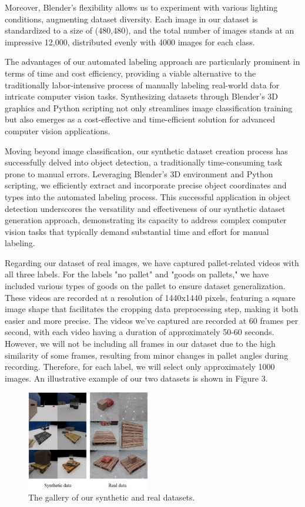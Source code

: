 \documentclass[sigconf,authordraft]{acmart}
\begin{document}
\noindent Moreover, Blender's flexibility allows us to experiment with various lighting conditions, augmenting dataset diversity. Each image in our dataset is standardized to a size of (480,480), and the total number of images stands at an impressive 12,000, distributed evenly with 4000 images for each class.

\noindent The advantages of our automated labeling approach are particularly prominent in terms of time and cost efficiency, providing a viable alternative to the traditionally labor-intensive process of manually labeling real-world data for intricate computer vision tasks. Synthesizing datasets through Blender's 3D graphics and Python scripting not only streamlines image classification training but also emerges as a cost-effective and time-efficient solution for advanced computer vision applications.

\noindent Moving beyond image classification, our synthetic dataset creation process has successfully delved into object detection, a traditionally time-consuming task prone to manual errors. Leveraging Blender's 3D environment and Python scripting, we efficiently extract and incorporate precise object coordinates and types into the automated labeling process. This successful application in object detection underscores the versatility and effectiveness of our synthetic dataset generation approach, demonstrating its capacity to address complex computer vision tasks that typically demand substantial time and effort for manual labeling.

\noindent Regarding our dataset of real images, we have captured pallet-related videos with all three labels. For the labels "no pallet" and "goods on pallets," we have included various types of goods on the pallet to ensure dataset generalization. These videos are recorded at a resolution of 1440x1440 pixels, featuring a square image shape that facilitates the cropping data preprocessing step, making it both easier and more precise. The videos we've captured are recorded at 60 frames per second, with each video having a duration of approximately 50-60 seconds. However, we will not be including all frames in our dataset due to the high similarity of some frames, resulting from minor changes in pallet angles during recording. Therefore, for each label, we will select only approximately 1000 images. An illustrative example of our two datasets is shown in Figure 3.


\begin{figure}[h]
  \centering
  \includegraphics[width=0.48\textwidth]{images/dataset.jpg}
  \caption{The gallery of our synthetic and real datasets.}
  \label{fig:your-image}
\end{figure}
\end{document}
